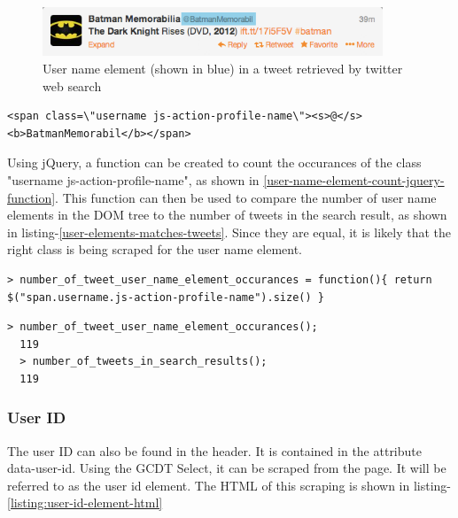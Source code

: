 \begin{figure}[H]
\includegraphics[width=4in]{image/tweet-user-field.png}
\centering
\caption{User name element (shown in blue) in a tweet retrieved by twitter web search}
\label{figure:tweet-user-field}
\end{figure}

\begin{lstlisting}[caption={HTML of the user name element in a tweet},label={user-name-element-html},captionpos=b]
  <span class=\"username js-action-profile-name\"><s>@</s><b>BatmanMemorabil</b></span>
\end{lstlisting}

\noindent
Using jQuery, a function can be created to count the occurances of the class "username js-action-profile-name", as shown in \ref{user-name-element-count-jquery-function}. This function can then be used to compare the number of user name elements in the DOM tree to the number of tweets in the search result, as shown in listing-\ref{user-elements-matches-tweets}. Since they are equal, it is likely that the right class is being scraped for the user name element.

\begin{lstlisting}[caption={Creating a function in GCDT Javascript Console for counting the occurance of user name elements on the twitter search result page},label={user-name-element-count-jquery-function},captionpos=b]
  > number_of_tweet_user_name_element_occurances = function(){ return $("span.username.js-action-profile-name").size() }
\end{lstlisting}


\begin{lstlisting}[caption={Running functions in GCDT Javascript Console to show that the number of user name elements matches the number of tweets},label={user-elements-matches-tweets},captionpos=b]
  > number_of_tweet_user_name_element_occurances();
  119
  > number_of_tweets_in_search_results();
  119
\end{lstlisting}

\subsubsection{User ID}
The user ID can also be found in the header. It is contained in the attribute data-user-id. Using the GCDT Select, it can be scraped from the page. It will be referred to as the user id element. The HTML of this scraping is shown in listing-\ref{listing:user-id-element-html}

